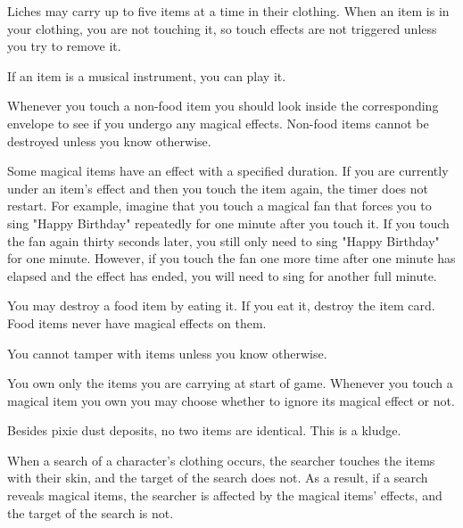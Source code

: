 \documentclass[green]{Sel}
\begin{document}
\name{\gItems{}}
Liches may carry up to five items at a time in their clothing. When an item is in your clothing, you are not touching it, so touch effects are not triggered unless you try to remove it.

If an item is a musical instrument, you can play it. 

Whenever you touch a non-food item you should look inside the corresponding envelope to see if you undergo any magical effects. Non-food items cannot be destroyed unless you know otherwise.

Some magical items have an effect with a specified duration. If you are currently under an item's effect and then you touch the item again, the timer does not restart. For example, imagine that you touch a magical fan that forces you to sing "Happy Birthday" repeatedly for one minute after you touch it. If you touch the fan again thirty seconds later, you still only need to sing "Happy Birthday" for one minute. However, if you touch the fan one more time after one minute has elapsed and the effect has ended, you will need to sing for another full minute.

You may destroy a food item by eating it. If you eat it, destroy the item card. Food items never have magical effects on them.

You cannot tamper with items unless you know otherwise.

You own only the items you are carrying at start of game. Whenever you touch a magical item you own you may choose whether to ignore its magical effect or not.

Besides pixie dust deposits, no two items are identical. This is a kludge.

When a search of a character's clothing occurs, the searcher touches the items with their skin, and the target of the search does not. As a result, if a search reveals magical items, the searcher is affected by the magical items' effects, and the target of the search is not.
\end{document}
